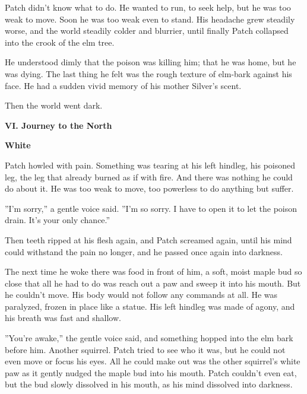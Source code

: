 \documentclass[11pt]{article}
\begin{document}
Patch didn't know what to do. He wanted to run, to seek help, but he was too weak to move. Soon he was too weak even to stand. His headache grew steadily worse, and the world steadily colder and blurrier, until finally Patch collapsed into the crook of the elm tree.\par
He understood dimly that the poison was killing him; that he was home, but he was dying. The last thing he felt was the rough texture of elm-bark against his face. He had a sudden vivid memory of his mother Silver's scent.\par
Then the world went dark.\par
\pagebreak \par
\par
\par
\par
\par
\par
\par
\par
\par
\par
\par
{\bf {}}
\normalsize{\pagebreak \par
}{\bf VI. Journey to the North\par

}\par
{\bf White\par
}\par
 Patch howled with pain. Something was tearing at his left hindleg, his poisoned leg, the leg that already burned as if with fire. And there was nothing he could do about it. He was too weak to move, too powerless to do anything but suffer.\par
 ''I'm sorry,'' a gentle voice said. ''I'm so sorry. I have to open it to let the poison drain. It's your only chance.''\par
 Then teeth ripped at his flesh again, and Patch screamed again, until his mind could withstand the pain no longer, and he passed once again into darkness.\par
 The next time he woke there was food in front of him, a soft, moist maple bud so close that all he had to do was reach out a paw and sweep it into his mouth. But he couldn't move. His body would not follow any commands at all. He was paralyzed, frozen in place like a statue. His left hindleg was made of agony, and his breath was fast and shallow.\par
 ''You're awake,'' the gentle voice said, and something hopped into the elm bark before him. Another squirrel. Patch tried to see who it was, but he could not even move or focus his eyes. All he could make out was the other squirrel's white paw as it gently nudged the maple bud into his mouth. Patch couldn't even eat, but the bud slowly dissolved in his mouth, as his mind dissolved into darkness.\par
\end{document}
